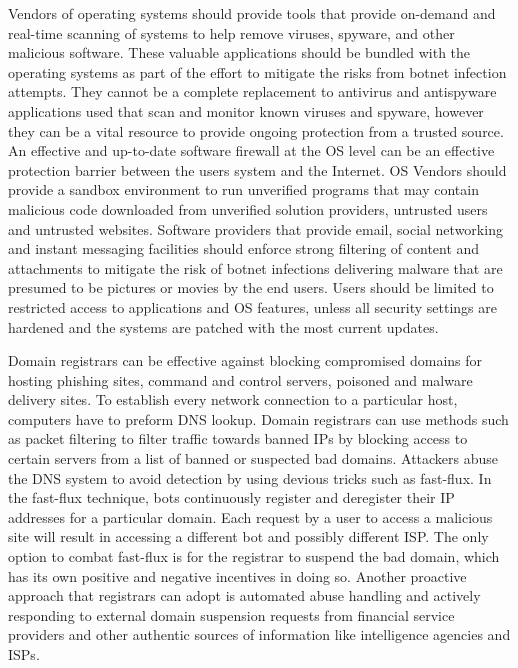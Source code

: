 Vendors of operating systems should provide tools that provide on-demand and real-time scanning of systems to help remove viruses, spyware, and other malicious software. These valuable applications should be bundled with the operating systems as part of the effort to mitigate the risks from botnet infection attempts. They cannot be a complete replacement to antivirus and antispyware applications used that scan and monitor known viruses and spyware, however they can be a vital resource to provide ongoing protection from a trusted source.
An effective and up-to-date software firewall at the OS level can be an effective protection barrier between the users system and the Internet. OS Vendors should provide a sandbox environment to run unverified programs that may contain malicious code downloaded from unverified solution providers, untrusted users and untrusted websites. Software providers that provide email, social networking and instant messaging facilities should enforce strong filtering of content and attachments to mitigate the risk of botnet infections delivering malware that are presumed to be pictures or movies by the end users. Users should be limited to restricted access to applications and OS features, unless all security settings are hardened and the systems are patched with the most current updates.	

Domain registrars can be effective against blocking compromised domains for hosting phishing sites, command and control servers, poisoned and malware delivery sites. To establish every network connection to a particular host, computers have to preform DNS lookup. Domain registrars can use methods such as packet filtering to filter traffic towards banned IPs by blocking access to certain servers from a list of banned or suspected bad domains. Attackers abuse the DNS system to avoid detection by using devious tricks such as fast-flux. In the fast-flux technique, bots continuously register and deregister their IP addresses for a particular domain. Each request by a user to access a malicious site will result in accessing a different bot and possibly different ISP. The only option to combat fast-flux is for the registrar to suspend the bad domain, which has its own positive and negative incentives in doing so. Another proactive approach that registrars can adopt is automated abuse handling and actively responding to external domain suspension requests from financial service providers and other authentic sources of information like intelligence agencies and ISPs.

